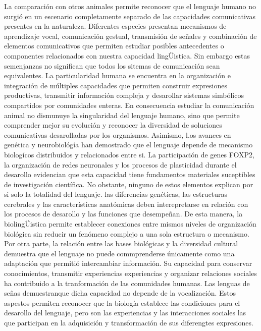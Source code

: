 \documentclass[12pt]{article}
\begin{document}
La comparación con otros animales permite reconocer que el lenguaje humano no surgió en un escenario completamente separado de las capacidades comunicativas presentes en la naturaleza. Diferentes especies presentan mecanismos de aprendizaje vocal, comunicación gestual, transmisión de señales y combinación de elementos comunicativos que permiten estudiar posibles antecedentes o componentes relacionados con nuestra capacidad lingÜistica. Sin embargo estas semenjanzas no significan que todos los sitemas de comunicación sean equivalentes. La particularidad humana se encuentra en la organización e integración de múltiples capacidades que permiten construir expresiones productivas, transmitir  información  compleja y desarollar sistemas simbólicos compartidos por comunidades enteras. En consecuencia estudiar la comunicación animal no dismunuye la singularidad del lenguaje humano, sino que permite comprender mejor su evolución y reconocer la diversidad de soluciones  comunicativas desarolladas por los organismos.
Asimismo, l.os avances en genética y neurobiológía  han demostrado que el lenguaje depende de mecanismo biologícos distribuidos y relacionados entre si. La participación de genes FOXP2, la organización de redes neuronales  y los procesos de plasticidad  durante el desarollo evidencian que esta capacidad  tiene fundamentos materiales suceptibles de investigación científica. No obstante, ninguno de estos elementos  explican por si  solo la totalidad del lenguaje. las diferencias  genéticas, las estructuras cerebrales  y las características anatómicas deben interepretarse en relación  con los procesos de desarollo  y las funciones que desempeñan. De esta manera, la biolingÜistica  permite establecer  conexiones entre mismos niveles de organización biológica sin reducir un fenómeno complejo a una sola estructura o mecanismo.
Por otra parte, la relación entre las bases biológicas y la diversidad cultural demuestra que el lenguaje no puede commprenderse únicamente como una adaptación que permitió  intercambiar información. Su capacidad para conservar conocimientos,  transmitir  experiencias experiencias y organizar  relaciones sociales  ha contribuido a la tranformación  de las comunidades humanas. Las lenguas de señas demuestranque dicha capacidad no depende de la vocalización. Estos aspestos permiten reconocer que la biología establece las condiciones para el desarollo del lenguaje, pero son las experiencias  y las interacciones  sociales las que participan en la adquisición  y transformación de sus diferengtes expresiones.
\end{document}
